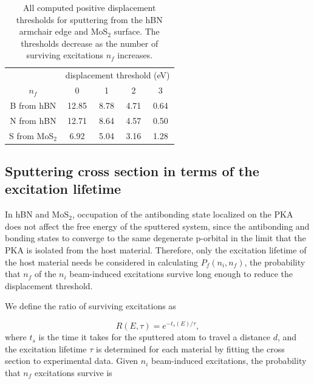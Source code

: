 \documentclass{article}
\begin{document}
\begin{table}
  \centering 
  \begin{tabular}{ccccc}
    \toprule &
    \multicolumn{4}{c}{displacement threshold (eV)} \\
    \cmidrule{2-5}
    $n_f$ &0 &1 &2 &3 \\
    \midrule
    B from hBN     &12.85 &8.78 &4.71 &0.64 \\  %
    N from hBN     &12.71 &8.64 &4.57 &0.50 \\  %
    S from MoS$_2$ &6.92  &5.04 &3.16 &1.28 \\  %
    \bottomrule
  \end{tabular}
  \caption{
    All computed positive displacement thresholds for sputtering from the hBN
    armchair edge and MoS$_2$ surface.
    The thresholds decrease as the number of surviving excitations $n_f$
    increases.
  } 
\label{tab:Ed}
\end{table}

\subsection{Sputtering cross section in terms of the excitation lifetime}
\label{sec:lifetime}

In hBN and MoS$_2$, occupation of the antibonding state localized on the PKA
does not affect the free energy of the sputtered system, since the antibonding
and bonding states to converge to the same degenerate p-orbital in the limit
that the PKA is isolated from the host material.
Therefore, only the excitation lifetime of the host material needs be
considered in calculating $P_f(n_i, n_f)$, the probability that $n_f$ of the
$n_i$ beam-induced excitations survive long enough to reduce the displacement
threshold.

We define the ratio of surviving excitations as

\begin{equation}
  R(E, \tau) = e^{-t_s(E)/\tau},
  \label{eq:R}
\end{equation}
%
where $t_s$ is the time it takes for the sputtered atom to travel a distance
$d$, and the excitation lifetime $\tau$ is determined for each material by
fitting the cross section to experimental data.
Given $n_i$ beam-induced excitations, the probability that $n_f$ excitations
survive is
\end{document}
